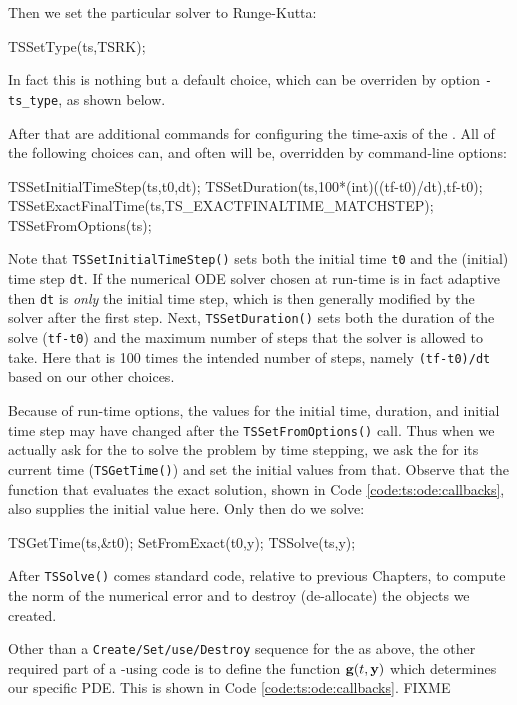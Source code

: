 Then we set the particular \pTS solver to Runge-Kutta:
\begin{code}
  TSSetType(ts,TSRK);
\end{code}
In fact this is nothing but a default choice, which can be overriden by option \texttt{-ts\_type}, as shown below.

After that are additional commands for configuring the time-axis of the \pTS.  All of the following choices can, and often will be, overridden by command-line options:
\begin{code}
  TSSetInitialTimeStep(ts,t0,dt);
  TSSetDuration(ts,100*(int)((tf-t0)/dt),tf-t0);
  TSSetExactFinalTime(ts,TS_EXACTFINALTIME_MATCHSTEP);
  TSSetFromOptions(ts);
\end{code}
Note that \texttt{TSSetInitialTimeStep()} sets both the initial time \texttt{t0} and the (initial) time step \texttt{dt}.  If the numerical ODE solver chosen at run-time is in fact adaptive then \texttt{dt} is \emph{only} the initial time step, which is then generally modified by the solver after the first step.  Next, \texttt{TSSetDuration()} sets both the duration of the solve (\texttt{tf-t0}) and the maximum number of steps that the solver is allowed to take.  Here that is 100 times the intended number of steps, namely \texttt{(tf-t0)/dt} based on our other choices.

Because of run-time options, the values for the initial time, duration, and initial time step may have changed after the \texttt{TSSetFromOptions()} call.  Thus when we actually ask for the \pTS to solve the problem by time stepping, we ask the \pTS for its current time (\texttt{TSGetTime()}) and set the initial values from that.  Observe that the function that evaluates the exact solution, shown in Code \ref{code:ts:ode:callbacks}, also supplies the initial value here.  Only then do we solve:
\begin{code}
  TSGetTime(ts,&t0);
  SetFromExact(t0,y);
  TSSolve(ts,y);
\end{code}
After \texttt{TSSolve()} comes standard code, relative to previous Chapters, to compute the norm of the numerical error and to destroy (de-allocate) the objects we created.

Other than a \texttt{Create/Set/use/Destroy} sequence for the \pTS as above, the other required part of a \pTS-using code is to define the function $\mathbf{g}(t,\mathbf{y})$ which determines our specific PDE.  This is shown in Code \ref{code:ts:ode:callbacks}.  FIXME


